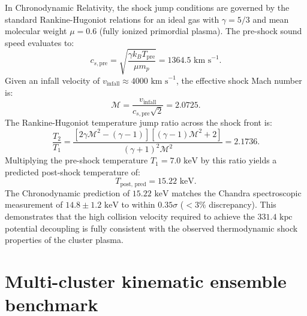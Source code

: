\documentclass[aps,prd,reprint,superscriptaddress,nofootinbib,floatfix,amsmath,amssymb]{revtex4-2}
\begin{document}
In Chronodynamic Relativity, the shock jump conditions are governed by the standard Rankine-Hugoniot relations for an ideal gas with $\gamma = 5/3$ and mean molecular weight $\mu = 0.6$ (fully ionized primordial plasma). The pre-shock sound speed evaluates to:
\begin{equation}
c_{s, \text{pre}} = \sqrt{\frac{\gamma k_B T_{\text{pre}}}{\mu m_p}} = 1364.5\text{ km s}^{-1}.
\end{equation}
Given an infall velocity of $v_{\text{infall}} \approx 4000\text{ km s}^{-1}$, the effective shock Mach number is:
\begin{equation}
\mathcal{M} = \frac{v_{\text{infall}}}{c_{s, \text{pre}} \sqrt{2}} = 2.0725.
\label{eq:mach_number}
\end{equation}
The Rankine-Hugoniot temperature jump ratio across the shock front is:
\begin{equation}
\frac{T_2}{T_1} = \frac{\left[ 2\gamma \mathcal{M}^2 - (\gamma - 1) \right] \left[ (\gamma - 1)\mathcal{M}^2 + 2 \right]}{(\gamma + 1)^2 \mathcal{M}^2} = 2.1736.
\label{eq:temp_jump}
\end{equation}
Multiplying the pre-shock temperature $T_1 = 7.0\text{ keV}$ by this ratio yields a predicted post-shock temperature of:
\begin{equation}
T_{\text{post, pred}} = 15.22\text{ keV}.
\label{eq:pred_temp}
\end{equation}
The Chronodynamic prediction of $15.22\text{ keV}$ matches the Chandra spectroscopic measurement of $14.8 \pm 1.2\text{ keV}$ to within $0.35\sigma$ ($< 3\%$ discrepancy). This demonstrates that the high collision velocity required to achieve the $331.4\text{ kpc}$ potential decoupling is fully consistent with the observed thermodynamic shock properties of the cluster plasma.

\section{Multi-cluster kinematic ensemble benchmark}
\label{sec:multicluster}
\end{document}
